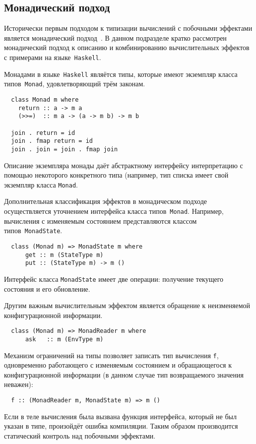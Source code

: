 \documentclass [a4paper] {article}
\begin{document}
\subsection{Монадический подход}

Исторически первым подходом к типизации вычислений с побочными эффектами
является монадический подход~\cite{Moggi:1989:CLM:77350.77353}. В данном подразделе
кратко рассмотрен монадический подход к описанию и комбинированию
вычислительных эффектов с примерами на языке~\texttt{Haskell}.

Монадами в языке~\texttt{Haskell} являётся типы, которые имеют экземпляр
класса типов~\texttt{Monad}, удовлетворяющий трём законам.
\begin{verbatim}
  class Monad m where
    return :: a -> m a
    (>>=)  :: m a -> (a -> m b) -> m b

  join . return = id
  join . fmap return = id
  join . join = join . fmap join
\end{verbatim}
Описание экземпляра монады даёт абстрактному интерфейсу
интерпретацию с помощью некоторого конкретного типа (например, тип списка имеет свой экземпляр класса \texttt{Monad}.

Дополнительная классификация эффектов в монадическом подходе осуществляется
уточнением интерфейса класса типов~\texttt{Monad}. Например, вычисления с
изменяемым состоянием представляются классом типов~\texttt{MonadState}.
\begin{verbatim}
  class (Monad m) => MonadState m where
      get :: m (StateType m)
      put :: (StateType m) -> m ()
\end{verbatim}
Интерфейс класса \texttt{MonadState} имеет две операции: получение текущего состояния и его обновление.

Другим важным вычислительным эффектом является обращение к
неизменяемой конфигурационной информации.
\begin{verbatim}
  class (Monad m) => MonadReader m where
      ask   :: m (EnvType m)
\end{verbatim}

Механизм ограничений на типы позволяет записать тип вычисления \texttt{f}, одновременно работающего с изменяемым состоянием и обращающегося к конфигурационной информации (в данном случае тип возвращаемого значения неважен):
\begin{verbatim}
  f :: (MonadReader m, MonadState m) => m ()
\end{verbatim}
Если в теле вычисления была вызвана функция интерфейса,
который не был указан в типе, произойдёт ошибка компиляции.
Таким образом производится статический контроль над побочными
эффектами.
\end{document}
